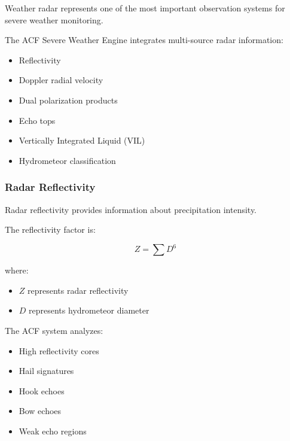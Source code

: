 Weather radar represents one of the most important observation systems
for severe weather monitoring.

The ACF Severe Weather Engine integrates multi-source radar information:

\begin{itemize}

\item Reflectivity

\item Doppler radial velocity

\item Dual polarization products

\item Echo tops

\item Vertically Integrated Liquid (VIL)

\item Hydrometeor classification

\end{itemize}



\subsubsection{Radar Reflectivity}

Radar reflectivity provides information about precipitation intensity.

The reflectivity factor is:

\[
Z=
\sum D^6
\]

where:

\begin{itemize}

\item $Z$ represents radar reflectivity

\item $D$ represents hydrometeor diameter

\end{itemize}


The ACF system analyzes:

\begin{itemize}

\item High reflectivity cores

\item Hail signatures

\item Hook echoes

\item Bow echoes

\item Weak echo regions

\end{itemize}


